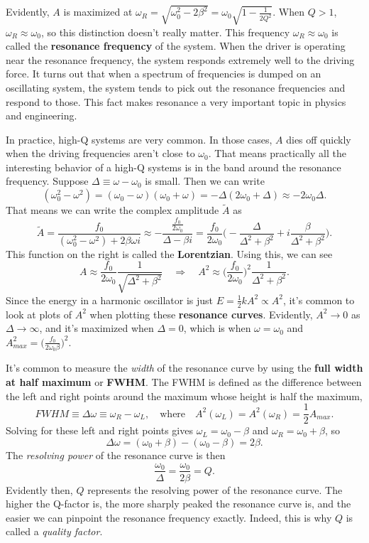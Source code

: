 \documentclass[
  letterpaper,
  DIV=11,
  numbers=noendperiod]{scrreprt}
\begin{document}
Evidently, \(A\) is maximized at
\(\omega_R = \sqrt{\omega_0^2-2\beta^2} = \omega_0 \sqrt{1-\frac{1}{2Q^2}}\).
When \(Q>1\), \(\omega_R \approx \omega_0\), so this distinction doesn't
really matter. This frequency \(\omega_R \approx \omega_0\) is called
the \textbf{resonance frequency} of the system. When the driver is
operating near the resonance frequency, the system responds extremely
well to the driving force. It turns out that when a spectrum of
frequencies is dumped on an oscillating system, the system tends to pick
out the resonance frequencies and respond to those. This fact makes
resonance a very important topic in physics and engineering.

In practice, high-Q systems are very common. In those cases, \(A\) dies
off quickly when the driving frequencies aren't close to \(\omega_0\).
That means practically all the interesting behavior of a high-Q systems
is in the band around the resonance frequency. Suppose
\(\Delta \equiv \omega - \omega_0\) is small. Then we can write \[
(\omega_0^2-\omega^2) = (\omega_0-\omega)(\omega_0+\omega) = -\Delta(2\omega_0+\Delta) \approx -2\omega_0 \Delta.
\] That means we can write the complex amplitude \(\tilde A\) as \[
\tilde A = \frac{f_0}{(\omega_0^2-\omega^2) + 2\beta\omega i} \approx -\frac{\frac{f_0}{2\omega_0}}{\Delta-\beta i} = \frac{f_0}{2\omega_0}\bigg(-\frac{\Delta}{\Delta^2+\beta^2} + i\frac{\beta}{\Delta^2+\beta^2} \bigg).
\] This function on the right is called the \textbf{Lorentzian}. Using
this, we can see \[
A \approx \frac{f_0}{2\omega_0} \frac{1}{\sqrt{\Delta^2 + \beta^2}} \quad \Longrightarrow \quad A^2 \approx \bigg(\frac{f_0}{2\omega_0}\bigg)^2 \frac{1}{\Delta^2 + \beta^2}.
\] Since the energy in a harmonic oscillator is just
\(E = \frac{1}{2}kA^2 \propto A^2\), it's common to look at plots of
\(A^2\) when plotting these \textbf{resonance curves}. Evidently,
\(A^2 \rightarrow 0\) as \(\Delta \rightarrow \infty\), and it's
maximized when \(\Delta = 0\), which is when \(\omega = \omega_0\) and
\(A_{max}^2 = \big(\frac{f_0}{2\omega_0 \beta}\big)^2\).

It's common to measure the \emph{width} of the resonance curve by using
the \textbf{full width at half maximum} or \textbf{FWHM}. The FWHM is
defined as the difference between the left and right points around the
maximum whose height is half the maximum, \[
FWHM \equiv \Delta \omega \equiv \omega_R - \omega_L, \quad \text{where} \quad A^2(\omega_L) = A^2(\omega_R) = \frac{1}{2}A_{max}.
\] Solving for these left and right points gives
\(\omega_L = \omega_0 - \beta\) and \(\omega_R = \omega_0 + \beta\), so
\[
\Delta \omega = (\omega_0 + \beta) - (\omega_0 - \beta) = 2\beta.
\] The \emph{resolving power} of the resonance curve is then \[
\frac{\omega_0}{\Delta} = \frac{\omega_0}{2\beta} = Q.
\] Evidently then, \(Q\) represents the resolving power of the resonance
curve. The higher the Q-factor is, the more sharply peaked the resonance
curve is, and the easier we can pinpoint the resonance frequency
exactly. Indeed, this is why \(Q\) is called a \emph{quality factor}.
\end{document}
